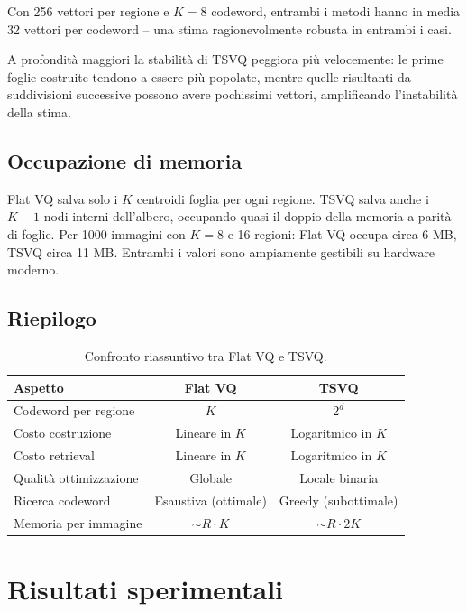 \documentclass[12pt, a4paper]{article}
\begin{document}
Con 256 vettori per regione e $K=8$ codeword, entrambi i metodi hanno in media 32 vettori
per codeword -- una stima ragionevolmente robusta in entrambi i casi.

A profondità maggiori la stabilità di TSVQ peggiora più velocemente: le prime foglie
costruite tendono a essere più popolate, mentre quelle risultanti da suddivisioni successive
possono avere pochissimi vettori, amplificando l'instabilità della stima.

\subsection{Occupazione di memoria}

Flat VQ salva solo i $K$ centroidi foglia per ogni regione. TSVQ salva anche i
$K-1$ nodi interni dell'albero, occupando quasi il doppio della memoria a parità di foglie.
Per 1000 immagini con $K=8$ e 16 regioni: Flat VQ occupa circa 6 MB, TSVQ circa 11 MB.
Entrambi i valori sono ampiamente gestibili su hardware moderno.

\subsection{Riepilogo}

\begin{table}[H]
\centering
\begin{tabular}{lcc}
\toprule
\textbf{Aspetto} & \textbf{Flat VQ} & \textbf{TSVQ} \\
\midrule
Codeword per regione       & $K$                  & $2^d$ \\
Costo costruzione          & Lineare in $K$       & Logaritmico in $K$ \\
Costo retrieval            & Lineare in $K$       & Logaritmico in $K$ \\
Qualità ottimizzazione     & Globale              & Locale binaria \\
Ricerca codeword           & Esaustiva (ottimale) & Greedy (subottimale) \\
Memoria per immagine       & $\sim R \cdot K$     & $\sim R \cdot 2K$ \\
\bottomrule
\end{tabular}
\caption{Confronto riassuntivo tra Flat VQ e TSVQ.}
\label{tab:summary}
\end{table}

\section{Risultati sperimentali}
\label{sec:evaluation}
\end{document}
